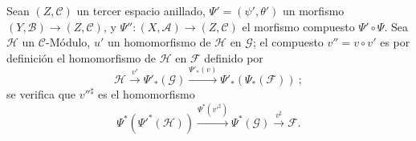 \begin{env}[4.4.8]
\label{0.4.4.8-fr}
Sean $(Z,\mathcal{C})$ un tercer espacio anillado,
$\Psi'=(\psi',\theta')$ un morfismo $(Y,\mathcal{B})\to(Z,\mathcal{C})$, y
$\Psi'':(X,\mathcal{A})\to(Z,\mathcal{C})$ el morfismo compuesto
$\Psi'\circ\Psi$. Sea $\mathcal{H}$ un $\mathcal{C}$-Módulo, $u'$ un
homomorfismo de $\mathcal{H}$ en $\mathcal{G}$; el compuesto
$v''=v\circ v'$ es por definición el homomorfismo de $\mathcal{H}$ en
$\mathcal{F}$ definido por
\[
  \mathcal{H}\xrightarrow{v'}\Psi'_*(\mathcal{G})
  \xrightarrow{\Psi'_*(v)}\Psi'_*(\Psi_*(\mathcal{F}))~;
\]
se verifica que ${v''}^\sharp$ es el homomorfismo
\[
  \Psi^*({\Psi'}^*(\mathcal{H}))
  \xrightarrow{\Psi^*({v'}^\sharp)}
  \Psi^*(\mathcal{G})
  \xrightarrow{v^\sharp}\mathcal{F}.
\]
\end{env}

